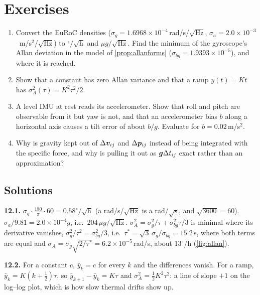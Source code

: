 \FloatBarrier
\section*{Exercises}

\begin{enumerate}[label=\textbf{12.\arabic*},ref=12.\arabic*]
\item\label{ex:12units} Convert the EuRoC densities ($\sigma_g=1.6968
  \times10^{-4}$\,rad/s/$\sqrt{\text{Hz}}$, $\sigma_a=2.0\times10^{-3}$\,
  m/s$^2$/$\sqrt{\text{Hz}}$) to $^\circ/\sqrt{\text{h}}$ and
  $\mu g/\sqrt{\text{Hz}}$. Find the minimum of the gyroscope's Allan
  deviation in the model of \cref{prop:allanforms} ($\sigma_{bg}=1.9393
  \times10^{-5}$), and where it is reached.
\item\label{ex:12ramp} Show that a constant has zero Allan variance and
  that a ramp $y(t)=Kt$ has $\sigma_A^2(\tau)=K^2\tau^2/2$.
\item\label{ex:12tilt} A level IMU at rest reads its accelerometer. Show
  that roll and pitch are observable from it but yaw is not, and that an
  accelerometer bias $b$ along a horizontal axis causes a tilt error of
  about $b/g$. Evaluate for $b=0.02$\,m/s$^2$.
\item\label{ex:12grav} Why is gravity kept out of $\Delta\bm{v}_{ij}$
  and $\Delta\bm{p}_{ij}$ instead of being integrated with the specific force,
  and why is pulling it out as $\bm{g}\Delta t_{ij}$ exact rather than an
  approximation?
\end{enumerate}

\subsection*{Solutions}

\textbf{12.1.} $\sigma_g\cdot\frac{180}\pi\cdot60=0.58^\circ/\sqrt{\text{h}}$
(a rad/s/$\sqrt{\text{Hz}}$ is a rad/$\sqrt{\text{s}}$, and $\sqrt{3600}
=60$). $\sigma_a/9.81=2.0\times10^{-4}g$, i.e.\ $204\,\mu g/\sqrt{\text{Hz}}$.
$\sigma_A^2=\sigma_g^2/\tau+\sigma_{bg}^2\tau/3$ is minimal where its
derivative vanishes, $\sigma_g^2/\tau^2=\sigma_{bg}^2/3$, i.e.\ $\tau^*=
\sqrt3\,\sigma_g/\sigma_{bg}=15.2$\,s, where both terms are equal and
$\sigma_A=\sigma_g\sqrt{2/\tau^*}=6.2\times10^{-5}$\,rad/s, about
$13^\circ$/h (\cref{fig:allan}).

\textbf{12.2.} For a constant $c$, $\bar y_k=c$ for every $k$ and the
differences vanish. For a ramp, $\bar y_k=K(k+\frac12)\tau$, so
$\bar y_{k+1}-\bar y_k=K\tau$ and $\sigma_A^2=\frac12K^2\tau^2$: a line of
slope $+1$ on the log--log plot, which is how slow thermal drifts show up.

